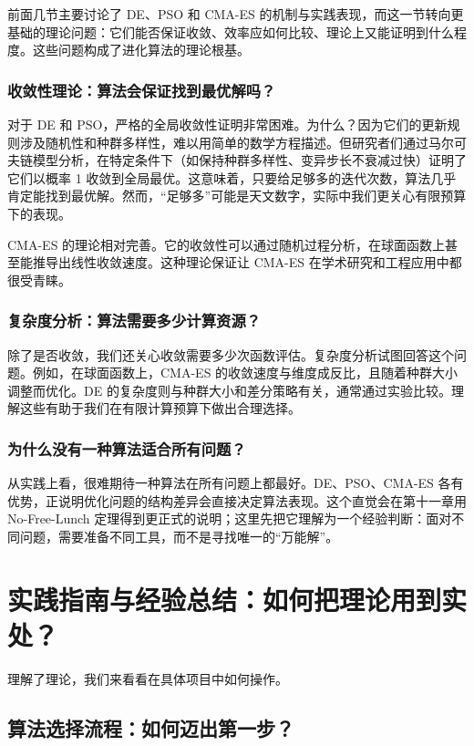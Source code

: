 \documentclass[lang=cn,zihao=-4,a4paper,fontset=windows]{beautybook}
\begin{document}
前面几节主要讨论了 DE、PSO 和 CMA-ES 的机制与实践表现，而这一节转向更基础的理论问题：它们能否保证收敛、效率应如何比较、理论上又能证明到什么程度。这些问题构成了进化算法的理论根基。

\subsubsection{收敛性理论：算法会保证找到最优解吗？}

对于 DE 和 PSO，严格的全局收敛性证明非常困难。为什么？因为它们的更新规则涉及随机性和种群多样性，难以用简单的数学方程描述。但研究者们通过马尔可夫链模型分析，在特定条件下（如保持种群多样性、变异步长不衰减过快）证明了它们以概率 1 收敛到全局最优。这意味着，只要给足够多的迭代次数，算法几乎肯定能找到最优解。然而，“足够多”可能是天文数字，实际中我们更关心有限预算下的表现。

CMA-ES 的理论相对完善。它的收敛性可以通过随机过程分析，在球面函数上甚至能推导出线性收敛速度。这种理论保证让 CMA-ES 在学术研究和工程应用中都很受青睐。

\subsubsection{复杂度分析：算法需要多少计算资源？}

除了是否收敛，我们还关心收敛需要多少次函数评估。复杂度分析试图回答这个问题。例如，在球面函数上，CMA-ES 的收敛速度与维度成反比，且随着种群大小调整而优化。DE 的复杂度则与种群大小和差分策略有关，通常通过实验比较。理解这些有助于我们在有限计算预算下做出合理选择。

\subsubsection{为什么没有一种算法适合所有问题？}

从实践上看，很难期待一种算法在所有问题上都最好。DE、PSO、CMA-ES 各有优势，正说明优化问题的结构差异会直接决定算法表现。这个直觉会在第十一章用 No-Free-Lunch 定理得到更正式的说明；这里先把它理解为一个经验判断：面对不同问题，需要准备不同工具，而不是寻找唯一的“万能解”。

\section{实践指南与经验总结：如何把理论用到实处？}

理解了理论，我们来看看在具体项目中如何操作。

\subsection{算法选择流程：如何迈出第一步？}
\end{document}
